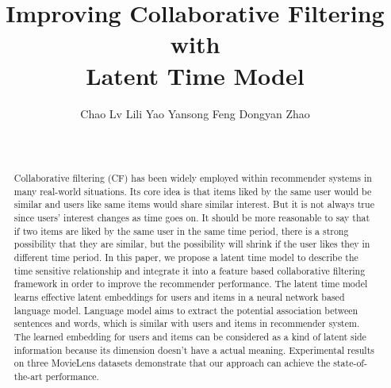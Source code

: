 \documentclass{sig-alternate-05-2015}
\begin{document}

\title{Improving Collaborative Filtering with\\
Latent Time Model}

\author{
\alignauthor
Chao Lv \quad
Lili Yao \quad
Yansong Feng \quad
Dongyan Zhao\\
\\
\\
}

\maketitle

\begin{abstract}
Collaborative filtering (CF) has been widely employed within
recommender systems in many real-world situations.
Its core idea is that items liked by the same user would be similar and
users like same items would share similar interest.
But it is not always true since users' interest changes as time goes on.
It should be more reasonable to say that
if two items are liked by the same user in the same time period,
there is a strong possibility that they are similar,
but the possibility will shrink if the user likes they in different time period.
In this paper,
we propose a latent time model to describe the time sensitive relationship
and integrate it into a feature based collaborative filtering framework
in order to improve the recommender performance.
The latent time model learns effective latent embeddings
for users and items in a neural network based language model.
Language model aims to extract the potential association
between sentences and words,
which is similar with users and items in recommender system.
The learned embedding for users and items can be considered as
a kind of latent side information because its dimension doesn't
have a actual meaning.
Experimental results on three MovieLens datasets demonstrate that
our approach can achieve the state-of-the-art performance.
\end{abstract}

\end{document}
